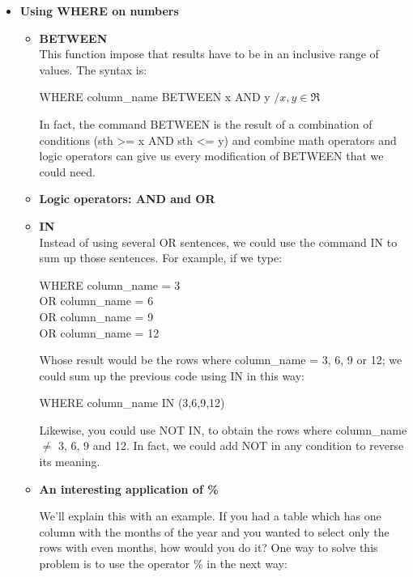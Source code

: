 \documentclass[10pt, oneside]{article}
\begin{document}
\begin{itemize}
	
	\item \textbf{Using WHERE on numbers}
	
	\begin{itemize}
		\item \textbf{BETWEEN} \\
		This function impose that results have to be in an inclusive range of values. The syntax is: 
		
		\begin{center}
			WHERE column\_name BETWEEN x AND y $/x,y\in\Re$
		\end{center}
		
		In fact, the command BETWEEN is the result of a combination of conditions (sth >= x AND sth <= y) and combine math operators and logic operators can give us every modification of BETWEEN that we could need.
		
		\item \textbf{Logic operators: AND and OR}
		\item \textbf{IN}\\
		Instead of using several OR sentences, we could use the command IN to sum up those sentences. For example, if we type: 
		
		\begin{center}
			\begin{minipage}{.3\linewidth}
				WHERE column\_name = 3 \\
				OR column\_name = 6 \\
				OR column\_name = 9 \\
				OR column\_name = 12 
			\end{minipage}
		\end{center}
		
		Whose result would be the rows where column\_name = 3, 6, 9 or 12; we could sum up the previous code using IN in this way:
		
		\begin{center}
			WHERE column\_name IN (3,6,9,12)
		\end{center}
		
		Likewise, you could use NOT IN, to obtain the rows where column\_name $\ne$ 3, 6, 9 and 12. In fact, we could add NOT in any condition to reverse its meaning.
		
		\item \textbf{An interesting application of \%}
		
		We'll explain this with an example. If you had a table which has one column with the months of the year and you wanted to select only the rows with even months, how would you do it? One way to solve this problem is to use the operator \% in the next way: 
		

\end{itemize}
\end{itemize}
\end{document}
